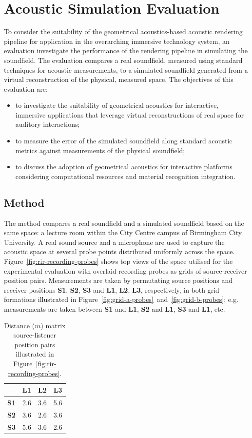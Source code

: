 \section{Acoustic Simulation Evaluation}
To consider the suitability of the geometrical acoustics-based acoustic rendering pipeline for application in the overarching immersive technology system, an evaluation investigate the performance of the rendering pipeline in simulating the soundfield. The evaluation compares a real soundfield, measured using standard techniques for acoustic measurements, to a simulated soundfield generated from a virtual reconstruction of the physical, measured space. The objectives of this evaluation are:
\begin{itemize}
    \item to investigate the suitability of geometrical acoustics for interactive, immersive applications that leverage virtual reconstructions of real space for auditory interactions;
    \item to measure the error of the simulated soundfield along standard acoustic metrics against measurements of the physical soundfield;
    \item to discuss the adoption of geometrical acoustics for interactive platforms considering computational resources and material recognition integration.
\end{itemize}

\subsection{Method}
The method compares a real soundfield and a simulated soundfield based on the same space: a lecture room within the City Centre campus of Birmingham City University. A real sound source and a microphone are used to capture the acoustic space at several probe points distributed uniformly across the space. Figure~\ref{fig:rir-recording-probes} shows top views of the space utilised for the experimental evaluation with overlaid recording probes as grids of source-receiver position pairs. Measurements are taken by permutating source positions and receiver positions \textbf{S1}, \textbf{S2}, \textbf{S3} and \textbf{L1}, \textbf{L2}, \textbf{L3}, respectively, in both grid formations illustrated in Figure~\ref{fig:grid-a-probes}~and~\ref{fig:grid-b-probes}; e.g. measurements are taken between \textbf{S1} and \textbf{L1}, \textbf{S2} and \textbf{L1}, \textbf{S3} and \textbf{L1}, etc. 

\begin{table}[]
\centering
\begin{tabular}{@{}llll@{}}
\toprule
   & \textbf{L1}  & \textbf{L2}  & \textbf{L3}  \\ \midrule
\textbf{S1} & 2.6 & 3.6 & 5.6 \\
\textbf{S2} & 3.6 & 2.6 & 3.6 \\
\textbf{S3} & 5.6 & 3.6 & 2.6 \\ \bottomrule
\end{tabular}
\caption{Distance ($m$) matrix source-listener position pairs illustrated in Figure~\ref{fig:rir-recording-probes}.}
\label{tab:source-listener-distances}
\end{table}

